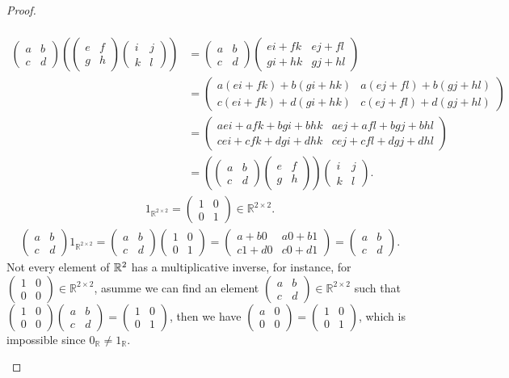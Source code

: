 \documentclass{amsart}
\newcommand{\bbr}{\mathbb{R}}
\newcommand{\aaa}{\left(\begin{smallmatrix}a&b\\c&d\end{smallmatrix}\right)}
\newcommand{\bbb}{\left(\begin{smallmatrix}e&f\\g&h\end{smallmatrix}\right)}
\newcommand{\ccc}{\left(\begin{smallmatrix}i&j\\k&l\end{smallmatrix}\right)}
\theoremstyle{plain}
\theoremstyle{definition}
\begin{document}
\begin{proof}
\begin{enumerate}[(a)]
\begin{align*}
			\end{align*}
			\begin{align*}
			\aaa\left(\bbb\ccc\right) &= \aaa \left(\begin{smallmatrix}ei+fk&ej+fl\\gi+hk&gj+hl\end{smallmatrix}\right) \\ &= \left(\begin{smallmatrix}a(ei+fk)+b(gi+hk)&a(ej+fl)+b(gj+hl)\\c(ei+fk)+d(gi+hk)&c(ej+fl)+d(gj+hl)\end{smallmatrix}\right) \\ &= \left(\begin{smallmatrix}aei+afk+bgi+bhk&aej+afl+bgj+bhl\\cei+cfk+dgi+dhk&cej+cfl+dgj+dhl\end{smallmatrix}\right) \\ &= \left(\aaa\bbb\right)\ccc.
			\end{align*}
			\begin{align*}
            1_{\bbr^{2\times 2}} = \left(\begin{smallmatrix}1&0\\0&1\end{smallmatrix}\right) \in \bbr^{2\times 2}.
			\end{align*}
			\begin{align*}
			\aaa 1_{\bbr^{2\times 2}} =\aaa \left(\begin{smallmatrix}1&0\\0&1\end{smallmatrix}\right) =  \left(\begin{smallmatrix}a+b0&a0+b1\\c1+d0&c0+d1\end{smallmatrix}\right)=\aaa.
			\end{align*}
			Not every element of $\bbr^{2\time2}$ has a multiplicative inverse, for instance,
		for $\left(\begin{smallmatrix}1&0\\0&0\end{smallmatrix}\right) \in \bbr^{2\times 2}$, asumme we can find an element $\aaa \in \bbr^{2\times 2}$ such that $\left(\begin{smallmatrix}1&0\\0&0\end{smallmatrix}\right) \aaa = \left(\begin{smallmatrix}1&0\\0&1\end{smallmatrix}\right)$, then we have $\left(\begin{smallmatrix}a&0\\0&0\end{smallmatrix}\right) = \left(\begin{smallmatrix}1&0\\0&1\end{smallmatrix}\right)$, which is impossible since $0_{\bbr} \neq 1_{\bbr} $.

\end{enumerate}
\end{proof}
\end{document}
